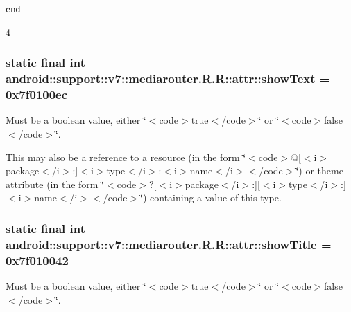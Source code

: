 {\tt end}

4\hypertarget{classandroid_1_1support_1_1v7_1_1mediarouter_1_1_r_1_1attr_9be3f05d65d37db12515c34d84d7b346}{
\subsubsection[{showText}]{\setlength{\rightskip}{0pt plus 5cm}static final int android::support::v7::mediarouter.R.R::attr::showText = 0x7f0100ec}}
\label{classandroid_1_1support_1_1v7_1_1mediarouter_1_1_r_1_1attr_9be3f05d65d37db12515c34d84d7b346}


Must be a boolean value, either \char`\"{}$<$code$>$true$<$/code$>$\char`\"{} or \char`\"{}$<$code$>$false$<$/code$>$\char`\"{}. 

This may also be a reference to a resource (in the form \char`\"{}$<$code$>$@\mbox{[}$<$i$>$package$<$/i$>$:\mbox{]}$<$i$>$type$<$/i$>$:$<$i$>$name$<$/i$>$$<$/code$>$\char`\"{}) or theme attribute (in the form \char`\"{}$<$code$>$?\mbox{[}$<$i$>$package$<$/i$>$:\mbox{]}\mbox{[}$<$i$>$type$<$/i$>$:\mbox{]}$<$i$>$name$<$/i$>$$<$/code$>$\char`\"{}) containing a value of this type. \hypertarget{classandroid_1_1support_1_1v7_1_1mediarouter_1_1_r_1_1attr_1b81661a6c4c8ce6ab72a758d4468636}{
\subsubsection[{showTitle}]{\setlength{\rightskip}{0pt plus 5cm}static final int android::support::v7::mediarouter.R.R::attr::showTitle = 0x7f010042}}
\label{classandroid_1_1support_1_1v7_1_1mediarouter_1_1_r_1_1attr_1b81661a6c4c8ce6ab72a758d4468636}


Must be a boolean value, either \char`\"{}$<$code$>$true$<$/code$>$\char`\"{} or \char`\"{}$<$code$>$false$<$/code$>$\char`\"{}. 

